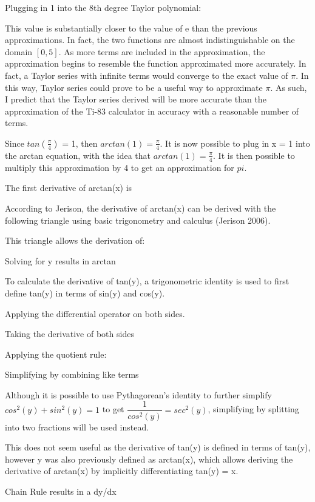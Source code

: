 Plugging in 1 into the 8th degree Taylor polynomial:

This value is substantially closer to the value of e than the previous approximations. In fact, the two functions are almost indistinguishable on the domain \([0,5]\). As more terms are included in the approximation, the approximation begins to resemble the function approximated more accurately. In fact, a Taylor series with infinite terms would converge to the exact value of \(\pi\). In this way, Taylor series could prove to be a useful way to approximate \(\pi\). As such, I predict that the Taylor series derived will be more accurate than the approximation of the Ti-83 calculator in accuracy with a reasonable number of terms.

Since \(tan(\frac{\pi}{4})\) = 1, then \(arctan(1)= \frac{\pi}{4}\). It is now possible to plug in x = 1 into the arctan equation, with the idea that \(arctan(1) = \frac{\pi}{4}\). It is then possible to multiply this approximation by 4 to get an approximation for \(pi\).



The first derivative of arctan(x) is 

According to Jerison, the derivative of arctan(x) can be derived with the following triangle using basic trigonometry and calculus (Jerison 2006).

This triangle allows the derivation of:

Solving for y results in arctan

To calculate the derivative of tan(y), a trigonometric identity is used to first define tan(y) in terms of sin(y) and cos(y).

Applying the differential operator on both sides.

Taking the derivative of both sides

Applying the quotient rule:

Simplifying by combining like terms

Although it is possible to use Pythagorean's identity to further simplify \(cos^{2}(y) + sin^{2}(y) = 1\) to get \(\dfrac{1}{cos^{2}(y)} = sec^{2}(y)\), simplifying by splitting into two fractions will be used instead. 

This does not seem useful as the derivative of tan(y) is defined in terms of tan(y), however y was also previously defined as arctan(x), which allows deriving the derivative of arctan(x) by implicitly differentiating tan(y) = x.

Chain Rule results in a dy/dx

